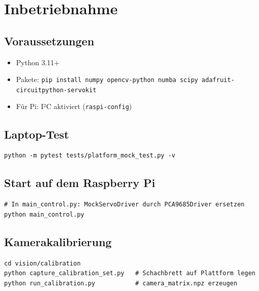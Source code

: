 \documentclass[11pt, a4paper]{scrartcl}
\begin{document}
\section{Inbetriebnahme}

\subsection{Voraussetzungen}

\begin{itemize}[leftmargin=*]
  \item Python 3.11+
  \item Pakete: \texttt{pip install numpy opencv-python numba scipy adafruit-circuitpython-servokit}
  \item Für Pi: I²C aktiviert (\texttt{raspi-config})
\end{itemize}

\subsection{Laptop-Test}

\begin{lstlisting}[caption={Kinematik-Test ohne Hardware}]
python -m pytest tests/platform_mock_test.py -v
\end{lstlisting}

\subsection{Start auf dem Raspberry Pi}

\begin{lstlisting}[caption={Regelloop starten}]
# In main_control.py: MockServoDriver durch PCA9685Driver ersetzen
python main_control.py
\end{lstlisting}

\subsection{Kamerakalibrierung}

\begin{lstlisting}[caption={Kalibrierbilder aufnehmen}]
cd vision/calibration
python capture_calibration_set.py   # Schachbrett auf Plattform legen
python run_calibration.py           # camera_matrix.npz erzeugen
\end{lstlisting}
\end{document}
